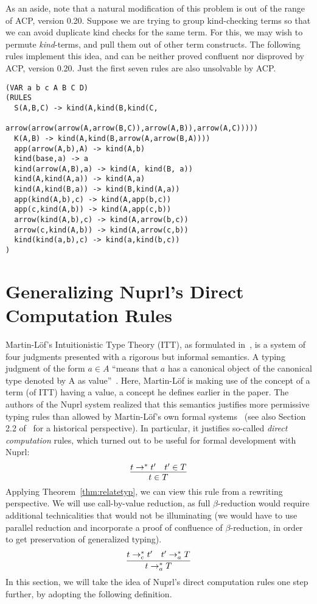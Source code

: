 \documentclass{LMCS}
\begin{document}
As an aside, note that a natural
modification of this problem is out of the range of ACP, version 0.20.
Suppose we are trying to group kind-checking terms so that we can
avoid duplicate kind checks for the same term.  For this, we may wish
to permute \textit{kind}-terms, and pull them out of other term
constructs.  The following rules implement this idea, and can be
neither proved confluent nor disproved by ACP, version 0.20.  Just the
first seven rules are also unsolvable by ACP. {\small
\begin{verbatim}
(VAR a b c A B C D)
(RULES
  S(A,B,C) -> kind(A,kind(B,kind(C,
              arrow(arrow(arrow(A,arrow(B,C)),arrow(A,B)),arrow(A,C)))))
  K(A,B) -> kind(A,kind(B,arrow(A,arrow(B,A))))
  app(arrow(A,b),A) -> kind(A,b)
  kind(base,a) -> a
  kind(arrow(A,B),a) -> kind(A, kind(B, a))
  kind(A,kind(A,a)) -> kind(A,a)
  kind(A,kind(B,a)) -> kind(B,kind(A,a))
  app(kind(A,b),c) -> kind(A,app(b,c))
  app(c,kind(A,b)) -> kind(A,app(c,b))
  arrow(kind(A,b),c) -> kind(A,arrow(b,c))
  arrow(c,kind(A,b)) -> kind(A,arrow(c,b))
  kind(kind(a,b),c) -> kind(a,kind(b,c))
)
\end{verbatim}
}

\section{Generalizing Nuprl's Direct Computation Rules}
\label{sec:genpresstlc}

Martin-L\"of's Intuitionistic Type Theory (ITT), as formulated
in~\cite{martinloef+84}, is a system of four judgments presented with
a rigorous but informal semantics.  A typing judgment of the form
$a\in A$ ``means that $a$ has a canonical object of the canonical type
denoted by A as value''~\cite[page 174]{martinloef+84}.  Here,
Martin-L\"of is making use of the concept of a term (of ITT) having a
value, a concept he defines earlier in the paper.  The authors of the
Nuprl system realized that this semantics justifies more permissive
typing rules than allowed by Martin-L\"of's own formal
systems~\cite{constable+86} (see also Section 2.2 of~\cite{allen+06}
for a historical perspective).  In particular, it justifies so-called
\emph{direct computation} rules, which turned out to be useful for
formal development with Nuprl:
\[
\infer{t\in T}{t\to^*t' & t'\in T}
\]
\noindent Applying Theorem~\ref{thm:relatetyp}, we can view this rule
from a rewriting perspective.  We will use call-by-value reduction, as
full $\beta$-reduction would require additional technicalities that
would not be illuminating (we would have to use parallel reduction and
incorporate a proof of confluence of $\beta$-reduction, in order to
get preservation of generalized typing).
\[
\infer{t\to_a^* T}{t\to_c^*t' & t'\to_a^* T}
\]
\noindent In this section, we will take the idea of Nuprl's direct
computation rules one step further, by adopting the following
definition.
\end{document}
